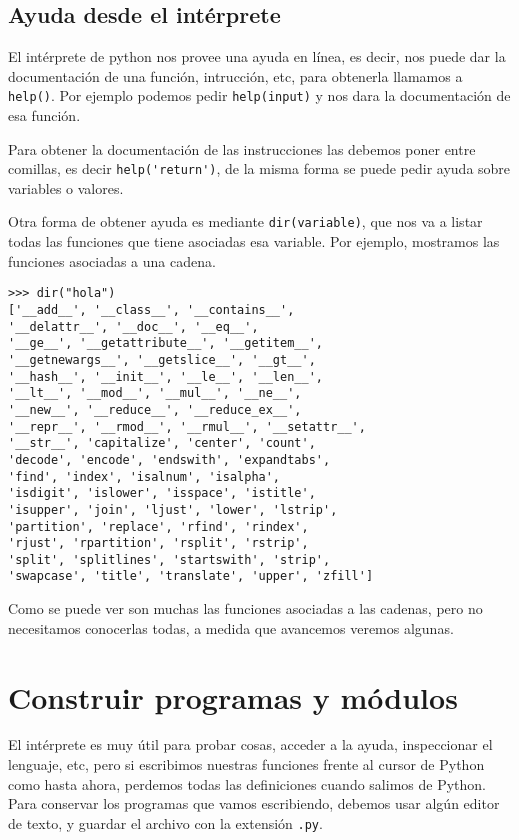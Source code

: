 \subsection{Ayuda desde el intérprete}

El intérprete de python nos provee una ayuda en línea, es decir, nos puede dar
la documentación de una función, intrucción, etc, para
obtenerla llamamos a \lstinline!help()!. Por ejemplo podemos pedir
\lstinline!help(input)! y nos dara la documentación de esa función.

Para obtener la documentación de las instrucciones las debemos poner entre
comillas, es decir \lstinline!help('return')!, de la misma forma se puede
pedir ayuda sobre variables o valores.

Otra forma de obtener ayuda es mediante \lstinline!dir(variable)!, que nos va a
listar todas las funciones que tiene asociadas esa variable. Por ejemplo,
mostramos las funciones asociadas a una cadena.

\begin{lstlisting}[numbers=none]
>>> dir("hola")
['__add__', '__class__', '__contains__',
'__delattr__', '__doc__', '__eq__',
'__ge__', '__getattribute__', '__getitem__',
'__getnewargs__', '__getslice__', '__gt__',
'__hash__', '__init__', '__le__', '__len__',
'__lt__', '__mod__', '__mul__', '__ne__',
'__new__', '__reduce__', '__reduce_ex__',
'__repr__', '__rmod__', '__rmul__', '__setattr__',
'__str__', 'capitalize', 'center', 'count',
'decode', 'encode', 'endswith', 'expandtabs',
'find', 'index', 'isalnum', 'isalpha',
'isdigit', 'islower', 'isspace', 'istitle',
'isupper', 'join', 'ljust', 'lower', 'lstrip',
'partition', 'replace', 'rfind', 'rindex',
'rjust', 'rpartition', 'rsplit', 'rstrip',
'split', 'splitlines', 'startswith', 'strip',
'swapcase', 'title', 'translate', 'upper', 'zfill']
\end{lstlisting}

Como se puede ver son muchas las funciones asociadas a las cadenas, pero no
necesitamos conocerlas todas, a medida que avancemos veremos algunas.

\section{Construir programas y módulos}

El intérprete es muy útil para probar cosas, acceder a la ayuda,
inspeccionar el lenguaje, etc, pero si escribimos nuestras funciones frente
al cursor de Python como hasta ahora, perdemos todas las definiciones
cuando salimos de Python. Para conservar los programas que vamos
escribiendo, debemos usar algún editor de texto, y guardar el archivo con
la extensión \verb+.py+.


